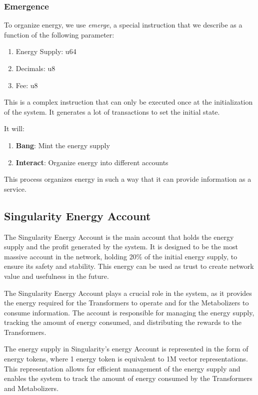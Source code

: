 \documentclass{article}
\begin{document}
\newpage

\subsubsection{Emergence}

To organize energy, we use \textit{emerge}, a special instruction that we describe as a function of the following parameter:
\begin{enumerate}
    \item Energy Supply: u64
    \item Decimals: u8
    \item Fee: u8
\end{enumerate}

This is a complex instruction that can only be executed once at the initialization of the system. It generates a lot of transactions to set the initial state.

It will:
\begin{enumerate}
    \item \textbf{Bang}: Mint the energy supply
    \item \textbf{Interact}: Organize energy into different accounts
\end{enumerate}

This process organizes energy in such a way that it can provide information as a service. 

\subsection{Singularity Energy Account}
The Singularity Energy Account is the main account that holds the energy supply and the profit generated by the system. It is designed to be the most massive account in the network, holding 20\% of the initial energy supply, to ensure its safety and stability. This energy can be used as trust to create network value and usefulness in the future.

The Singularity Energy Account plays a crucial role in the system, as it provides the energy required for the Transformers to operate and for the Metabolizers to consume information. The account is responsible for managing the energy supply, tracking the amount of energy consumed, and distributing the rewards to the Transformers.

The energy supply in Singularity's energy Account is represented in the form of energy tokens, where 1 energy token is equivalent to 1M vector representations. This representation allows for efficient management of the energy supply and enables the system to track the amount of energy consumed by the Transformers and Metabolizers.
\end{document}

